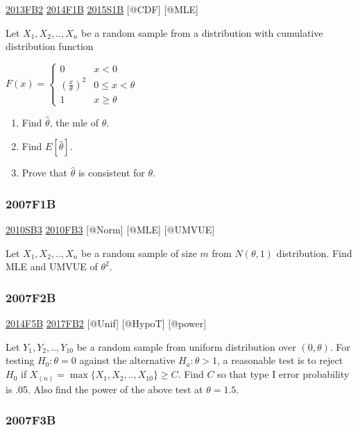 \documentclass[6pt,Portrait]{article}
\begin{document}
\protect\hyperlink{fb2-2}{2013FB2} \protect\hyperlink{f1b-1}{2014F1B}
\protect\hyperlink{s1b-1}{2015S1B} {[}@CDF{]} {[}@MLE{]}

Let \(X_1,X_2,..,X_n\) be a random sample from a distribution with
cumulative distribution function

\(F(x)=\begin{cases}0&x<0\\(\frac{x}\theta)^2& 0\le x<\theta\\1& x\ge\theta\end{cases}\)

\begin{enumerate}
\def\labelenumi{(\alph{enumi})}
\item
  Find \(\hat\theta\), the mle of \(\theta\).
\item
  Find \(E[\hat\theta]\).
\item
  Prove that \(\hat\theta\) is consistent for \(\theta\).
\end{enumerate}

\hypertarget{f1b}{%
\subsubsection{2007F1B}\label{f1b}}

\protect\hyperlink{sb3-1}{2010SB3} \protect\hyperlink{fb3-1}{2010FB3}
{[}@Norm{]} {[}@MLE{]} {[}@UMVUE{]}

Let \(X_1,X_2,..,X_n\) be a random sample of size \(m\) from
\(N(\theta,1)\) distribution. Find MLE and UMVUE of \(\theta^2\).

\hypertarget{f2b}{%
\subsubsection{2007F2B}\label{f2b}}

\protect\hyperlink{f5b-1}{2014F5B} \protect\hyperlink{fb2-3}{2017FB2}
{[}@Unif{]} {[}@HypoT{]} {[}@power{]}

Let \(Y_1,Y_2,..,Y_{10}\) be a random sample from uniform distribution
over \((0,\theta)\). For testing \(H_0:\theta=0\) against the
alternative \(H_a:\theta>1\), a reasonable test is to reject \(H_0\) if
\(X_{(n)}=\max\{X_1,X_2,..,X_{10}\}\ge C\). Find \(C\) so that type I
error probability is .05. Also find the power of the above test at
\(\theta=1.5\).

\hypertarget{f3b}{%
\subsubsection{2007F3B}\label{f3b}}
\end{document}
